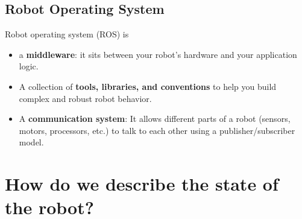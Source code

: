 \documentclass[10pt]{article}
\begin{document}
\subsection*{Robot Operating System}
Robot operating system (ROS) is
\begin{itemize}
	\item a \textbf{middleware}: it sits between your robot's hardware and your application logic.
	\item A collection of \textbf{tools, libraries, and conventions} to help you build complex and robust robot behavior.
	\item A \textbf{communication system}: It allows different parts of a robot (sensors, motors, processors, etc.) to talk to each other using a publisher/subscriber model.
\end{itemize}

\section*{How do we describe the state of the robot?}
\end{document}
